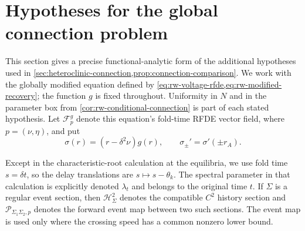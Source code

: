 \section{Hypotheses for the global connection problem}
\label{sec:supp-connection-details}

This section gives a precise functional-analytic form of the additional
hypotheses used in
\cref{sec:heteroclinic-connection,prop:connection-comparison}.  We work
with the globally modified equation defined by
\cref{eq:rw-voltage-rfde,eq:rw-modified-recovery}; the function \(g\) is
fixed throughout.  Uniformity in \(N\) and in the parameter box from
\cref{cor:rw-conditional-connection} is part of each stated hypothesis.
Let \(\mathcal F_p^g\) denote this equation's fold-time RFDE vector field,
where \(p=(\nu,\eta)\), and put
\[
 \sigma(r)=(r-\delta^2\nu)g(r),
 \qquad \sigma_\pm'=\sigma'(\pm r_A).
\]

Except in the characteristic-root calculation at the equilibria, we use
fold time \(s=\delta t\), so the delay translations are
\(s\mapsto s-\theta_k\).  The spectral parameter in that calculation is
explicitly denoted \(\lambda_t\) and belongs to the original time \(t\).
If \(\Sigma\) is a regular event section, then
\(\mathscr H_\Sigma^2\) denotes the compatible \(C^2\) history section and
\(\mathcal P_{\Sigma_1\Sigma_2,p}\) denotes the forward event map between
two such sections.  The event map is used only where the crossing speed has
a common nonzero lower bound.

